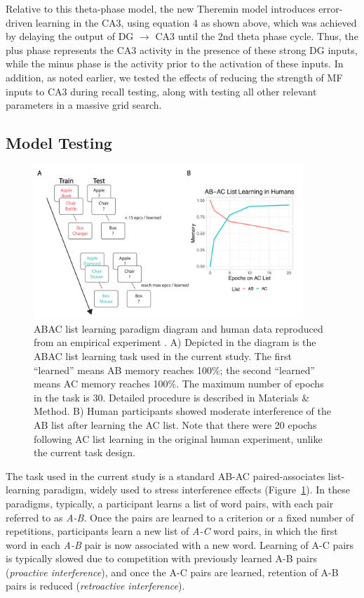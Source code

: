 \documentclass[11pt,twoside]{article}
\newif\myifpdf
\begin{document}
Relative to this theta-phase model, the new Theremin model introduces error-driven learning in the CA3, using equation 4 as shown above, which was achieved by delaying the output of DG $\rightarrow$ CA3 until the 2nd theta phase cycle.  Thus, the plus phase represents the CA3 activity in the presence of these strong DG inputs, while the minus phase is the activity prior to the activation of these inputs.  In addition, as noted earlier, we tested the effects of reducing the strength of MF inputs to CA3 during recall testing, along with testing all other relevant parameters in a massive grid search.

\subsection{Model Testing}

\begin{figure}
  \centering\includegraphics[width=4in]{fig_hip_edl_abac}
  \caption{\footnotesize ABAC list learning paradigm diagram and human data reproduced from an empirical experiment \citep{BarnesUnderwood60}. A) Depicted in the diagram is the ABAC list learning task used in the current study. The first ``learned'' means AB memory reaches 100\%; the second ``learned'' means AC memory reaches 100\%. The maximum number of epochs in the task is 30. Detailed procedure is described in Materials \& Method. B) Human participants showed moderate interference of the AB list after learning the AC list. Note that there were 20 epochs following AC list learning in the original human experiment, unlike the current task design. }
\label{fig.abac}
\end{figure}

The task used in the current study is a standard AB-AC paired-associates list-learning paradigm, widely used to stress interference effects \citep{BarnesUnderwood60,McCloskeyCohen89} (Figure~\ref{fig.abac}). In these paradigms, typically, a participant learns a list of word pairs, with each pair referred to as \emph{A-B}. Once the pairs are learned to a criterion or a fixed number of repetitions, participants learn a new list of \emph{A-C} word pairs, in which the first word in each \emph{A-B} pair is now associated with a new word. Learning of A-C pairs is typically slowed due to competition with previously learned A-B pairs (\emph{proactive interference}), and once the A-C pairs are learned, retention of A-B pairs is reduced (\emph{retroactive interference}).
\end{document}
